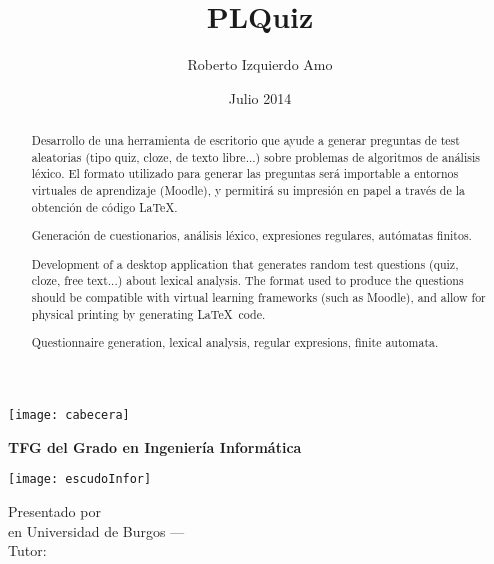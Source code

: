 \documentclass[a4paper,11pt,oneside]{memoir}
\title{PLQuiz}
\author{Roberto Izquierdo Amo}
\date{Julio 2014}
\makeatletter
\def\maketitle{
  \null
  \thispagestyle{empty}
\noindent\texttt{[image: cabecera]}\vspace{1cm}%
  \vfill
  \colorbox{cpardoBox}{%
    \begin{minipage}{.8\textwidth}
      \vspace{.5cm}\Large
      \begin{center}
      \textbf{TFG del Grado en Ingeniería Informática}\vspace{.6cm}\\
      \textbf{\LARGE\@title{}}
      \end{center}
      \vspace{.2cm}
    \end{minipage}

  }%
  \hfill\begin{minipage}{.20\textwidth}
    \texttt{[image: escudoInfor]}
  \end{minipage}
  \vfill
  \begin{center}%
  {%
    \noindent\LARGE
    Presentado por \@author{}\\ 
    en Universidad de Burgos --- \@date{}\\
    Tutor: \@tutor{}\\
  }%
  \end{center}%
  \null
  \cleardoublepage
  }
\makeatother
\begin{document}
\maketitle

\frontmatter

\renewcommand*\abstractname{Resumen}
\begin{abstract}
Desarrollo de una herramienta de escritorio que ayude a generar preguntas de test aleatorias (tipo quiz, cloze, de texto libre...) sobre problemas de algoritmos de análisis léxico.
El formato utilizado para generar las preguntas será importable a entornos virtuales de aprendizaje (Moodle), y permitirá su impresión en papel a través de la obtención de código \LaTeX .
\end{abstract}

\renewcommand*\abstractname{Descriptores}
\begin{abstract}
Generación de cuestionarios, análisis léxico, expresiones regulares, autómatas finitos.
\end{abstract}

\clearpage

\renewcommand*\abstractname{Abstract}
\begin{abstract}
Development of a desktop application that generates random test questions (quiz, cloze, free text...) about lexical analysis.
The format used to produce the questions should be compatible with virtual learning frameworks (such as Moodle), and allow for physical printing by generating \LaTeX\ code.
\end{abstract}

\renewcommand*\abstractname{Keywords}
\begin{abstract}
Questionnaire generation, lexical analysis, regular expresions, finite automata.
\end{abstract}

\clearpage

\tableofcontents

\clearpage

\listoffigures

\clearpage



\mainmatter








\appendix







\end{document}
